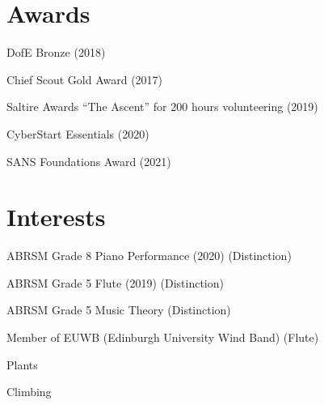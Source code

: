 \documentclass[]{hieudo-build}
\begin{document}
\begin{minipage}[t]{0.36\textwidth}

	\section{Awards}
	DofE Bronze (2018) \\
	\minisectionsep

	Chief Scout Gold Award (2017) \\
	\minisectionsep

	Saltire Awards “The Ascent” for 200 hours volunteering (2019) \\
	\minisectionsep

	CyberStart Essentials (2020) \\
	\minisectionsep

	SANS Foundations Award (2021) \\

	\minisectionsep

	\section{Interests}

	ABRSM Grade 8 Piano Performance (2020) (Distinction) \\
	\minisectionsep

	ABRSM Grade 5 Flute (2019) (Distinction) \\
	\minisectionsep

	ABRSM Grade 5 Music Theory (Distinction)\\
    \minisectionsep

    Member of EUWB (Edinburgh University Wind Band) (Flute)
	\minisectionsep

    Plants
    \minisectionsep

    Climbing
    \sectionsep
 

\end{minipage}
\hfill
\end{document}
